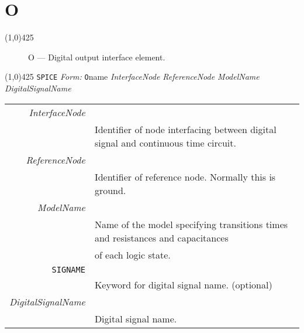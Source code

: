
\oddsidemargin 10mm \topmargin 0.0in \textwidth 5.5in \textheight
7.375in \evensidemargin 1.0in \headheight 0.18in \footskip 0.16in
%
\section[O \- Digital Output Interface]{ \hspace{70mm}\huge\textbf{O}}
\linethickness{1mm}
\line(1,0){425}
\normalsize
\begin{figure}[h]
\centerline{\epsfxsize=2in} \caption{O ---
Digital output interface element.}
\end{figure}
\newline
\linethickness{0.5mm} \line(1,0){425}
\newline
\texttt{SPICE} \textit{Form:}
\newline
{\tt O}name {\it InterfaceNode ReferenceNode ModelName}
   {\it DigitalSignalName} \E
\newline
\begin{tabular}{r l}
{\it InterfaceNode} & \\
     & Identifier of node interfacing between digital signal and
     continuous time circuit.\\
{\it ReferenceNode} & \\
     & Identifier of reference node. Normally this is ground.\\
{\it ModelName} & \\
     & Name of the model specifying transitions times and resistances and
     capacitances\\
     & of each logic state.\\
{\tt SIGNAME} & \\
     & Keyword for digital signal name. (optional)\\
{\it DigitalSignalName} & \\
     & Digital signal name.\\
\end{tabular}
